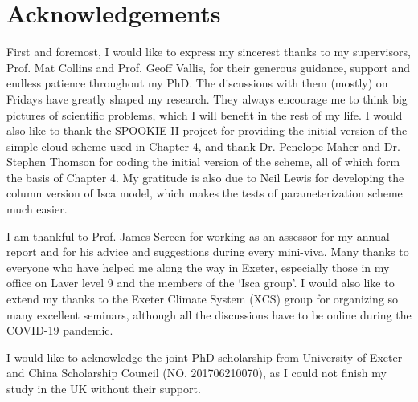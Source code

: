 \makedeclaration

\newpage
\chapter*{Acknowledgements}
First and foremost, I would like to express my sincerest thanks to my supervisors, Prof. Mat Collins and Prof. Geoff Vallis, for their generous guidance, support and endless patience throughout my PhD. The discussions with them (mostly) on Fridays have greatly shaped my research. They always encourage me to think big pictures of scientific problems, which I will benefit in the rest of my life. I would also like to thank the SPOOKIE II project for providing the initial version of the simple cloud scheme used in Chapter 4, and thank Dr. Penelope Maher and Dr. Stephen Thomson for coding the initial version of the scheme, all of which form the basis of Chapter 4. My gratitude is also due to Neil Lewis for developing the column version of Isca model, which makes the tests of parameterization scheme much easier.

I am thankful to Prof. James Screen for working as an assessor for my annual report and for his advice and suggestions during every mini-viva. Many thanks to everyone who have helped me along the way in Exeter, especially those in my office on Laver level 9 and the members of the `Isca group'. I would also like to extend my thanks to the Exeter Climate System (XCS) group for organizing so many excellent seminars, although all the discussions have to be online during the COVID-19 pandemic.


I would like to acknowledge the joint PhD scholarship from University of Exeter and China Scholarship Council (NO. 201706210070), as I could not finish my study in the UK without their support.

